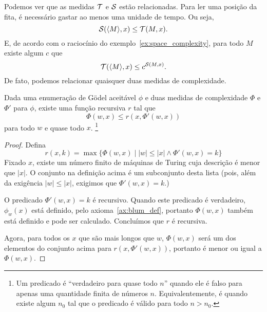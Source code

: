 Podemos ver que as medidas ${\mathcal{T}}$ e ${\mathcal{S}}$ estão relacionadas.
Para ler uma posição da fita,
é necessário gastar ao menos uma unidade de tempo.
Ou seja,
\begin{equation*}
    {\mathcal{S}}(\langle M \rangle, x) \leq {\mathcal{T}}(M, x).
\end{equation*}
E, de acordo com o raciocínio do exemplo~\ref{ex:space_complexity},
para todo $M$ existe algum $c$ que
\begin{equation*}
    {\mathcal{T}}(\langle M \rangle, x) \leq c^{{\mathcal{S}}(M, x)}.
\end{equation*}
De fato, podemos relacionar quaisquer duas medidas de complexidade.

\begin{theorem}
    \label{thm:measure_related}
    Dada uma enumeração de Gödel aceitável $\phi$
    e duas medidas de complexidade $\Phi$ e $\Phi'$ para $\phi$,
    existe uma função recursiva $r$ tal que
    \begin{equation*}
        \Phi(w, x) \leq r( x, \Phi'(w, x))
    \end{equation*}
    para todo $w$ e quase todo $x$.%
    \footnote{
        Um predicado é ``verdadeiro para quase todo $n$''
        quando ele é falso para apenas uma quantidade finita de números $n$.
        Equivalentemente,
        é quando existe algum $n_0$ tal que
        o predicado é válido para todo $n > n_0$.
    }
\end{theorem}

\begin{proof}
    Defina
    \begin{equation*}
        r( x, k ) = \max \{ \Phi(w, x) \mid |w| \leq |x| \land \Phi'(w, x) = k \}
    \end{equation*}
    Fixado $x$, existe um número finito de máquinas de Turing
    cuja descrição é menor que $|x|$.
    O conjunto na definição acima é um subconjunto desta lista
    (pois, além da exigência $|w| \leq |x|$,
    exigimos que $\Phi'(w, x) = k$.)

    O predicado $\Phi'(w, x) = k$ é recursivo.
    Quando este predicado é verdadeiro,
    $\phi_w(x)$ está definido, pelo axioma~\ref{ax:blum_def},
    portanto $\Phi(w, x)$ também está definido e pode ser calculado.
    Concluímos que $r$ é recursiva.

    Agora, para todos os $x$ que são mais longos que $w$,
    $\Phi(w, x)$ será um dos elementos do conjunto acima
    para $r(x, \Phi'(w, x))$,
    portanto é menor ou igual a $\Phi(w, x)$.
\end{proof}

